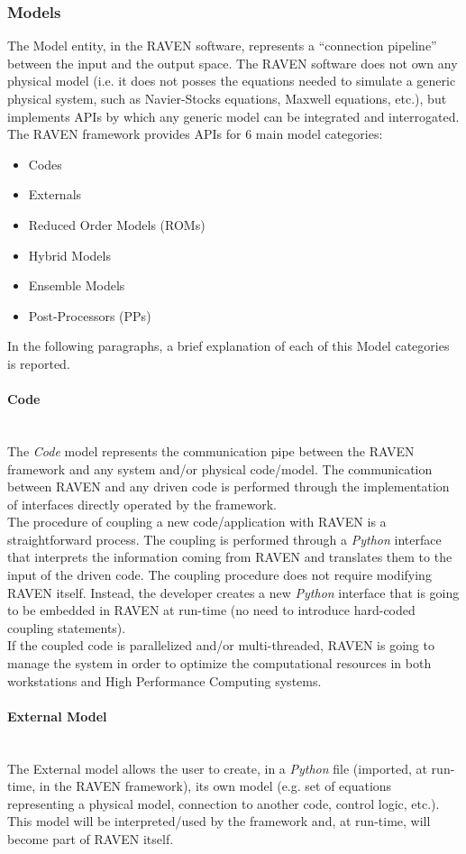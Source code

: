 \subsubsection{Models}
The Model entity, in the RAVEN software, represents a ``connection pipeline'' between the input and the output space. The 
RAVEN software does not own any physical model (i.e. it does not posses the equations needed to simulate a generic 
physical system, such as Navier-Stocks equations, Maxwell equations, etc.), but implements APIs by which any generic 
model can be integrated and interrogated. The RAVEN framework provides APIs for 
6 main model categories: 
\begin{itemize}
  \item Codes
  \item Externals
  \item Reduced Order Models (ROMs)
  \item Hybrid Models
  \item Ensemble Models
  \item Post-Processors (PPs)
\end{itemize}
In the 
following paragraphs, a brief explanation of each of this Model categories is reported.
\paragraph{Code} ~\\
The \textit{Code} model represents the communication pipe between the RAVEN framework and any system and/or 
physical code/model. The communication between RAVEN and any driven code is performed through the implementation 
of interfaces directly operated by the framework.
\\The procedure of coupling a new code/application with RAVEN is a straightforward process. The coupling is performed 
through a \textit{Python}  interface that interprets the information coming from RAVEN and translates them to the input of 
the driven code. The coupling procedure does not require modifying RAVEN itself. Instead, the developer creates a new 
\textit{Python} interface that is going to be embedded in RAVEN at run-time (no need to introduce hard-coded coupling 
statements). 
\\ If the coupled code is parallelized and/or multi-threaded, RAVEN is going to manage the system in order to optimize the 
computational resources in both workstations and High Performance Computing systems.

\paragraph{External Model} ~\\
The External model allows the user to create, in a \textit{Python} file (imported, at run-time, in the RAVEN framework), its 
own model (e.g. set of equations representing a physical model, connection to another code, control logic, etc.). This 
model will be interpreted/used by the framework and, at run-time, will become part of RAVEN itself.

